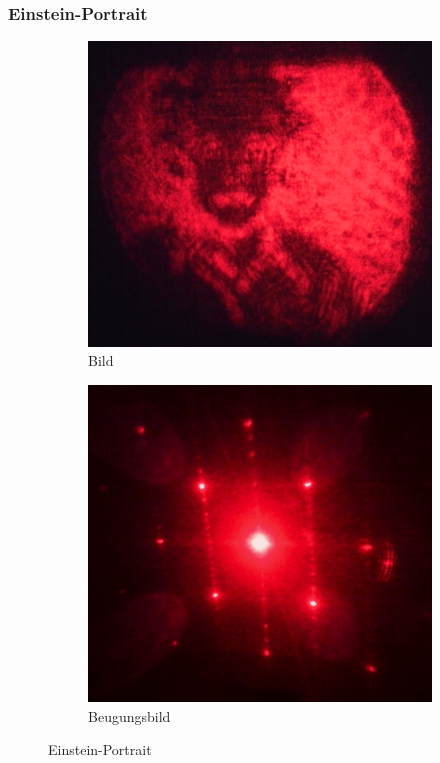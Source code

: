 \subsubsection{Einstein-Portrait}


\begin{figure}[p]
	\centering
	\begin{subfigure}[b]{0.49\textwidth}
		\includegraphics[width=\textwidth]{data/optics/06_Einstein_Bild}
		\caption{Bild}
	\end{subfigure}
	\begin{subfigure}[b]{0.49\textwidth}
		\includegraphics[width=\textwidth]{data/optics/06_Einstein_Beugung}
		\caption{Beugungsbild} 		\label{fig:Einstein_BG}
	\end{subfigure}
	\caption{Einstein-Portrait}				\label{fig:Einstein}
	\vspace{-1em}
\end{figure}

